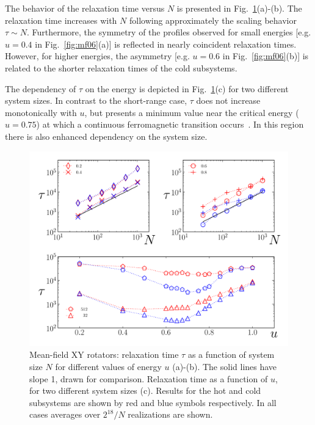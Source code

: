 \documentclass[aps,pre,showpacs,twocolumn,superscriptaddress,floatfix]{revtex4-1}
\begin{document}
The behavior of the relaxation time versus $N$ is presented in Fig.~\ref{fig:Taus1over5_HMF}(a)-(b). 
The relaxation time increases with $N$ following approximately the scaling behavior $\tau \sim N$. 
%
Furthermore,   the symmetry of the profiles observed for small energies [e.g. $u=0.4$ in Fig.~\ref{fig:mf06}(a)] 
is reflected in nearly coincident relaxation times. 
However,  for higher energies, the asymmetry  [e.g. $u=0.6$ in Fig.~\ref{fig:mf06}(b)] 
is related to the shorter relaxation times of the cold subsystems.  


%
The dependency of $\tau$ on the energy is depicted in  Fig.~\ref{fig:Taus1over5_HMF}(c) 
for two different system sizes. 
In contrast to the short-range case, $\tau$ does not increase monotonically with $u$, but presents 
a minimum value near the critical energy ($u=0.75$) at which a continuous ferromagnetic transition 
occurs~\cite{Anteneodo1998}. In this region there is also 
enhanced dependency on the system size. 
 
 
\begin{figure}
 \centering
 \includegraphics[width=0.95\linewidth]{./Taus1over5_HMF_final.pdf}
 \caption{Mean-field XY rotators:  relaxation time $\tau$ as a function of  system size $N$
 for different values of energy $u$ (a)-(b). 
The solid lines have slope 1, drawn for comparison. 
%
Relaxation time as a function of  $u$, for two different system sizes (c). 
Results for the hot and cold subsystems are shown by red and blue symbols respectively. 
In all cases averages over $2^{18}/N$ realizations are shown.  
}
 \label{fig:Taus1over5_HMF}
\end{figure}
\end{document}
